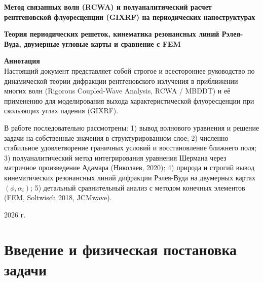 \documentclass[a4paper,11pt]{article}
\begin{document}
\begin{titlepage}
    \centering
    \vspace*{1.2cm}
    
    {\Huge\bfseries\color{primary} Метод связанных волн (RCWA) и полуаналитический расчет рентгеновской флуоресценции (GIXRF) на периодических наноструктурах\par}
    
    \vspace{1.2cm}
    {\Large\bfseries Теория периодических решеток, кинематика резонансных линий Рэлея-Вуда, двумерные угловые карты и сравнение с FEM\par}
    
    \vspace{2.0cm}
    \begin{tcolorbox}[colback=blue!3!white,colframe=primary!70!black,arc=2mm,width=0.88\textwidth]
        \centering
        \textbf{Аннотация}\\[0.5em]
        \small Настоящий документ представляет собой строгое и всестороннее руководство по динамической теории дифракции рентгеновского излучения в приближении многих волн (Rigorous Coupled-Wave Analysis, RCWA / MBDDT) и её применению для моделирования выхода характеристической флуоресценции при скользящих углах падения (GIXRF). 
        
        В работе последовательно рассмотрены:
        1) вывод волнового уравнения и решение задачи на собственные значения в структурированном слое;
        2) численно стабильное удовлетворение граничных условий и восстановление ближнего поля;
        3) полуаналитический метод интегрирования уравнения Шермана через матричное произведение Адамара (Николаев, 2020);
        4) природа и строгий вывод кинематических резонансных линий дифракции Рэлея-Вуда на двумерных картах $(\phi, \alpha_i)$;
        5) детальный сравнительный анализ с методом конечных элементов (FEM, Soltwisch 2018, JCMwave).
    \end{tcolorbox}
    
    \vfill
    {\large 2026 г.\par}
\end{titlepage}

\tableofcontents
\newpage

\section*{Введение и физическая постановка задачи}
\end{document}
